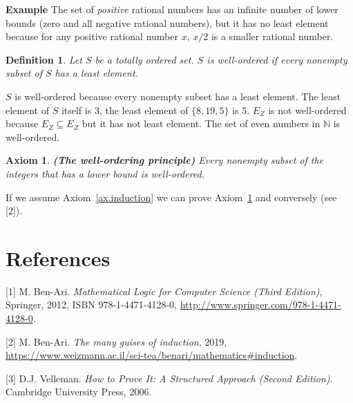 \documentclass[12pt,a4paper]{article}
\newtheorem{definition}[theorem]{Definition}
\newtheorem{axiom}[theorem]{Axiom}
\newenvironment{example}{\textbf{Example}}{}
\begin{document}
\begin{example}
The set of \emph{positive} rational numbers has an infinite number of lower bounds (zero and all negative rational numbers), but it has no least element because for any positive rational number $x$, $x/2$ is a smaller rational number.
\end{example}
\begin{definition} Let $S$ be a totally ordered set. $S$ is \emph{well-ordered} if \emph{every} nonempty subset of $S$ has a least element.
\end{definition}

$S$ is well-ordered because every nonempty subset has a least element. The least element of $S$ itself is $3$, the least element of $\{8, 19, 5\}$ is $5$. $E_Z$ is not well-ordered because $E_Z\subseteq E_Z$ but it has not least element. The set of even numbers in $\mathbb{N}$ is well-ordered.

\begin{axiom}\label{ax.wop} \textbf{(The well-ordering principle)} Every nonempty subset of the integers that has a lower bound is well-ordered.
\end{axiom}

If we assume Axiom~\ref{ax.induction} we can prove Axiom~\ref{ax.wop} and conversely (see [2]).


\section{References}

[1] M. Ben-Ari. \textit{Mathematical Logic for Computer Science (Third Edition)}, Springer, 2012, ISBN 978-1-4471-4128-0, \url{http://www.springer.com/978-1-4471-4128-0}.

[2] M. Ben-Ari. \textit{The many guises of induction}, 2019, \url{https://www.weizmann.ac.il/sci-tea/benari/mathematics#induction}.

[3] D.J. Velleman. \textit{How to Prove It: A Structured Approach (Second Edition)}. Cambridge University Press, 2006.
\end{document}
